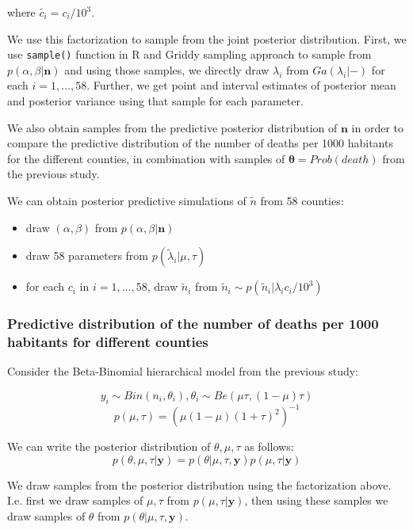 \documentclass[11pt,twocolumn]{asaproc}
\begin{document}
where $\tilde{c_i} = c_i/10^3$.

We use this factorization to sample from the joint posterior distribution. First, we use \texttt{sample()} function in R and Griddy sampling approach to sample from $p(\alpha, \beta | \mathbf{n})$ and using those samples, we directly draw $\lambda_i$ from $Ga(\lambda_i|-)$ for each $i = 1, ..., 58$. Further, we get point and interval estimates of posterior mean and posterior variance using that sample for each parameter.

We also obtain samples from the predictive posterior distribution of $\mathbf{n}$ in order to compare the predictive distribution of the number of deaths per 1000 habitants for the different counties, in combination with samples of $\mathbf{\theta} = Prob(death)$ from the previous study. 

We can obtain posterior predictive simulations of $\tilde{n}$ from 58 counties:

\begin{itemize}
\item draw $(\alpha, \beta)$ from $p(\alpha, \beta | \mathbf{n})$
\item draw 58 parameters from $p(\tilde{\lambda}_i | \mu, \tau)$
\item for each $c_i$ in $i = 1, ..., 58$, draw $\tilde{n}_i$ from $\tilde{n}_i \sim p(\tilde{n}_i | \lambda_ic_i /10^3)$
\end{itemize}




\subsubsection{Predictive distribution of the number of deaths per 1000 habitants for different counties}

Consider the Beta-Binomial hierarchical model from the previous study:

$$y_i \sim Bin(n_i, \theta_i), \theta_i \sim Be(\mu\tau, (1-\mu)\tau)$$ $$p(\mu, \tau) = (\mu(1-\mu)(1+\tau)^2)^{-1}$$ 

We can write the posterior distribution of $\theta, \mu, \tau$ as follows: $$p(\theta, \mu, \tau | \mathbf{y}) = p(\theta|\mu, \tau,  \mathbf{y})p(\mu, \tau | \mathbf{y})$$

We draw samples from the posterior distribution using the factorization above. I.e. first we draw samples of $\mu, \tau$ from $p(\mu, \tau |  \mathbf{y})$, then using these samples we draw samples of $\theta$ from $p(\theta | \mu, \tau, \mathbf{y})$.  
\end{document}
